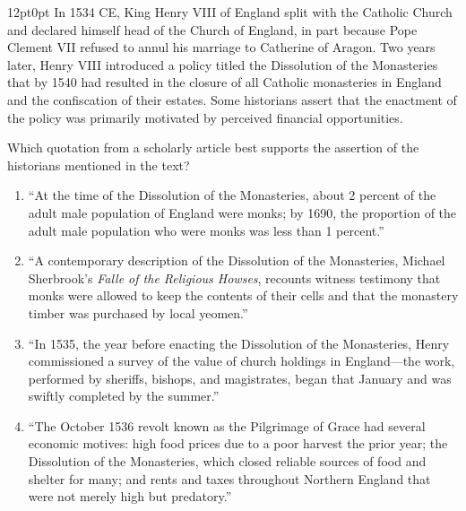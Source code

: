 \documentclass[11pt, twocolumn]{article}
\newcounter{questionnum}
\begin{document}
\vspace{6pt}\noindent
\begin{minipage}{\columnwidth}\raggedright
\noindent{}\par\vspace{8pt}
\begin{adjustwidth}{12pt}{0pt}
In 1534 CE, King Henry VIII of England split with the Catholic Church and declared himself head of the Church of England, in part because Pope Clement VII refused to annul his marriage to Catherine of Aragon. Two years later, Henry VIII introduced a policy titled the Dissolution of the Monasteries that by 1540 had resulted in the closure of all Catholic monasteries in England and the confiscation of their estates. Some historians assert that the enactment of the policy was primarily motivated by perceived financial opportunities.
\vspace{6pt}

Which quotation from a scholarly article best supports the assertion of the historians mentioned in the text?
\begin{enumerate}[label=\Alph*),leftmargin=18pt,topsep=3pt,itemsep=2pt]
  \item ``At the time of the Dissolution of the Monasteries, about 2 percent of the adult male population of England were monks; by 1690, the proportion of the adult male population who were monks was less than 1 percent.''
  \item ``A contemporary description of the Dissolution of the Monasteries, Michael Sherbrook's \textit{Falle of the Religious Howses}, recounts witness testimony that monks were allowed to keep the contents of their cells and that the monastery timber was purchased by local yeomen.''
  \item ``In 1535, the year before enacting the Dissolution of the Monasteries, Henry commissioned a survey of the value of church holdings in England---the work, performed by sheriffs, bishops, and magistrates, began that January and was swiftly completed by the summer.''
  \item ``The October 1536 revolt known as the Pilgrimage of Grace had several economic motives: high food prices due to a poor harvest the prior year; the Dissolution of the Monasteries, which closed reliable sources of food and shelter for many; and rents and taxes throughout Northern England that were not merely high but predatory.''
\end{enumerate}
\end{adjustwidth}
\end{minipage}\par
\end{document}
